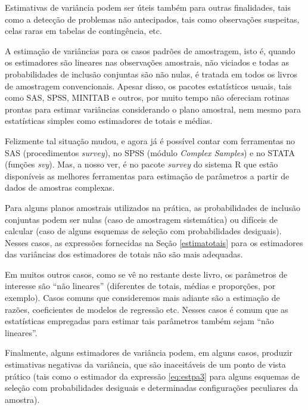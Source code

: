 \documentclass[
  12pt,
  brazilian,
]{book}
\theoremstyle{definition}
\theoremstyle{definition}
\theoremstyle{definition}
\theoremstyle{definition}
\theoremstyle{remark}
\begin{document}
Estimativas de variância podem ser úteis também para outras finalidades, tais como a detecção de problemas não antecipados, tais como observações suspeitas, celas raras em tabelas de contingência, etc.

A estimação de variâncias para os casos padrões de amostragem, isto é, quando os estimadores são lineares nas observações amostrais, não viciados e todas as probabilidades de inclusão conjuntas são não nulas, é tratada em todos os
livros de amostragem convencionais. Apesar disso, os pacotes estatísticos usuais, tais como SAS, SPSS, MINITAB e outros, por muito tempo não ofereciam rotinas prontas para estimar variâncias considerando o plano amostral, nem mesmo para estatísticas simples como estimadores de totais e médias.

Felizmente tal situação mudou, e agora já é possível contar com ferramentas no SAS (procedimentos \emph{survey}), no SPSS (módulo \emph{Complex Samples}) e no STATA (funções \emph{svy}). Mas, a nosso ver, é no pacote \emph{survey} do sistema R que estão disponíveis as melhores ferramentas para estimação de parâmetros a partir de dados de amostras complexas.

Para alguns planos amostrais utilizados na prática, as probabilidades de inclusão conjuntas podem ser nulas (caso de amostragem sistemática) ou difíceis de calcular (caso de alguns esquemas de seleção com probabilidades desiguais). Nesses casos, as expressões fornecidas na Seção \ref{estimatotais} para os estimadores das variâncias dos estimadores de totais não são mais adequadas.

Em muitos outros casos, como se vê no restante deste livro, os parâmetros de interesse são ``não lineares'' (diferentes de totais, médias e proporções, por exemplo). Casos comuns que consideremos mais adiante são a estimação de razões,
coeficientes de modelos de regressão etc. Nesses casos é comum que as estatísticas empregadas para estimar tais parâmetros também sejam ``não lineares''.

Finalmente, alguns estimadores de variância podem, em alguns casos, produzir estimativas negativas da variância, que são inaceitáveis de um ponto de vista prático (tais como o estimador da expressão \eqref{eq:estpa3} para alguns esquemas de seleção com probabilidades desiguais e determinadas configurações peculiares da
amostra).
\end{document}
